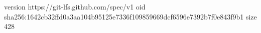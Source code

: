 version https://git-lfs.github.com/spec/v1
oid sha256:1642cb32ffd0a3aa104b95125e7336f109859669dcf6596e7392b7f0e843f9b1
size 428
